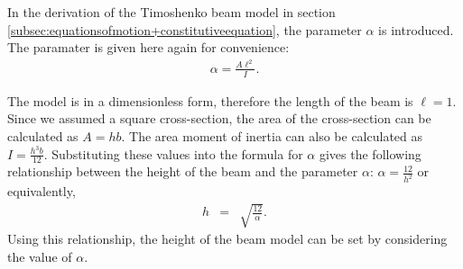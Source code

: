 \documentclass[../../main.tex]{subfiles}
\begin{document}
\begin{figure}[h!]
{{\begin{minipage}[b]{0.8\linewidth}
\begin{center}
				\end{center}
			\end{minipage}
		}
	}
\end{figure}\label{fig:compare:1D+2D}

In the derivation of the Timoshenko beam model in section \ref{subsec:equationsofmotion+constitutiveequation}, the parameter $\alpha$ is 
introduced. The paramater is given here again for convenience:
\begin{eqnarray*}
	\alpha = \frac{A\ell^2}{I}.
\end{eqnarray*}

The model is in a dimensionless form, therefore the length of the beam is $\ell = 1$. Since we assumed a square cross-section, the area of the cross-section can be calculated as $\displaystyle A = hb$. The area moment of inertia can also be calculated as $\displaystyle I = \frac{h^3b}{12}$. Substituting these values into the formula for $\alpha$ gives the following relationship between the height of the beam and the parameter $\alpha$: $\displaystyle \alpha = \frac{12}{h^2}$
or equivalently,
\begin{eqnarray}
	h & = & \sqrt{\frac{12}{\alpha}}. \label{eq:h-alpha-relationship}
\end{eqnarray}
 Using this relationship, the height of the beam model can be set by considering the value of $\alpha$.
\end{document}

